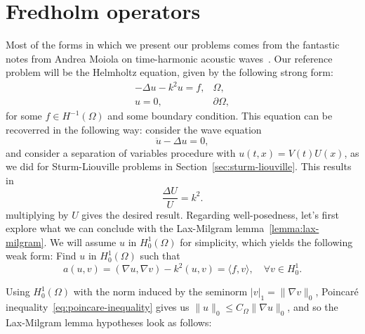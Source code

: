 \section{Fredholm operators}\label{sec:fredholm}
Most of the forms in which we present our problems comes from the fantastic notes from Andrea Moiola on time-harmonic acoustic waves~\cite{moiola2021scattering}. Our reference problem will be the Helmholtz equation, given by the following strong form:
\begin{equation}
    \begin{aligned}
        -\Delta u -k^2 u = f, &\Omega,\\
        u=0, &\partial\Omega,
    \end{aligned}
\end{equation}
for some $f\in H^{-1}(\Omega)$ and some boundary condition. This equation can be recoverred in the following way: consider the wave equation
\begin{equation*}
    \ddot u - \Delta u = 0,
\end{equation*}
and consider a separation of variables procedure with $u(t,x) = V(t)U(x)$, as we did for Sturm-Liouville problems in Section~\ref{sec:sturm-liouville}. This results in 
\begin{equation*}
    \frac{\Delta U}{U} = k^2.
\end{equation*}
multiplying by $U$ gives the desired result. Regarding well-posedness, let's first explore what we can conclude with the Lax-Milgram lemma~\ref{lemma:lax-milgram}. We will assume $u$ in $H_0^1(\Omega)$ for simplicity, which yields the following weak form: Find $u$ in $H_0^1(\Omega)$ such that
\begin{equation}
    a(u,v) = (\nabla u, \nabla v) - k^2(u,v) = \langle f, v\rangle, \quad \forall v\in H_0^1.
\end{equation}

Using $H_0^1(\Omega)$ with the norm induced by the seminorm $|v|_1 = \|\nabla v\|_0$, Poincaré inequality~\eqref{eq:poincare-inequality} gives us $\|u\|_0\leq C_{\Omega}\|\nabla u\|_0$, and so the Lax-Milgram lemma hypotheses look as follows: 


